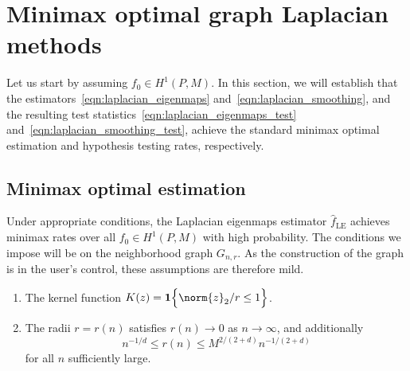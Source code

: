 \documentclass{article}
\newcommand{\1}{\mathbf{1}}
\newcommand{\wh}[1]{\widehat{#1}}
\newcommand{\LE}{\mathrm{LE}}
\theoremstyle{alden}
\theoremstyle{aldenthm}
\theoremstyle{definition}
\theoremstyle{remark}
\begin{document}
\section{Minimax optimal graph Laplacian methods}
\label{sec:minimax_optimal_graph_Laplacian_methods}

Let us start by assuming $f_0 \in H^1(P,M)$. In this section, we will establish that the estimators~\eqref{eqn:laplacian_eigenmaps} and~\eqref{eqn:laplacian_smoothing}, and the resulting test statistics~\eqref{eqn:laplacian_eigenmaps_test} and~\eqref{eqn:laplacian_smoothing_test}, achieve the standard minimax optimal estimation and hypothesis testing rates, respectively. 

\subsection{Minimax optimal estimation}

Under appropriate conditions, the Laplacian eigenmaps estimator $\wh{f}_{\LE}$ achieves minimax rates over all $f_0 \in H^1(P,M)$ with high probability. The conditions we impose will be on the neighborhood graph $G_{n,r}$. As the construction of the graph is in the user's control, these assumptions are therefore mild.
\begin{enumerate}[label=(K\arabic*)]
	\item 
	\label{asmp:kernel_form}
	The kernel function $K(z) = \1\Bigl\{\norm{z}_2/r \leq 1 \Bigr\}$.
	\item 
	\label{asmp:kernel_radius_estimation}
	The radii $r = r(n)$ satisfies $r(n) \to 0$ as $n \to \infty$, and additionally
	\begin{equation*}
	n^{-1/d}\leq r(n) \leq M^{2/(2 + d)}n^{-1/(2 + d)}
	\end{equation*}
	for all $n$ sufficiently large.
\end{enumerate}
\end{document}
